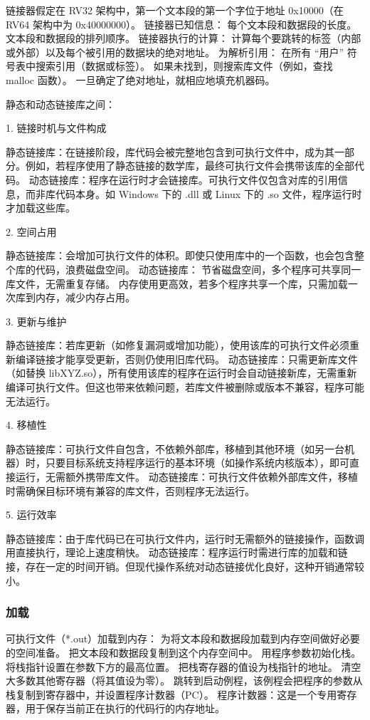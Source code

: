 \documentclass{ctexart}
\begin{document}
链接器假定在 RV32 架构中，第一个文本段的第一个字位于地址 0x10000（在 RV64 架构中为 0x40000000）。
链接器已知信息：
每个文本段和数据段的长度。
文本段和数据段的排列顺序。
链接器执行的计算：
计算每个要跳转的标签（内部或外部）以及每个被引用的数据块的绝对地址。
为解析引用：
在所有 “用户” 符号表中搜索引用（数据或标签）。
如果未找到，则搜索库文件（例如，查找 malloc 函数）。
一旦确定了绝对地址，就相应地填充机器码。\par
静态和动态链接库之间：\par
1. 链接时机与文件构成\par
静态链接库：在链接阶段，库代码会被完整地包含到可执行文件中，成为其一部分。例如，若程序使用了静态链接的数学库，最终可执行文件会携带该库的全部代码。
动态链接库：程序在运行时才会链接库。可执行文件仅包含对库的引用信息，而非库代码本身。如 Windows 下的 .dll 或 Linux 下的 .so 文件，程序运行时才加载这些库。\par
2. 空间占用\par
静态链接库：会增加可执行文件的体积。即使只使用库中的一个函数，也会包含整个库的代码，浪费磁盘空间。
动态链接库：
节省磁盘空间，多个程序可共享同一库文件，无需重复存储。
内存使用更高效，若多个程序共享一个库，只需加载一次库到内存，减少内存占用。\par
3. 更新与维护\par
静态链接库：若库更新（如修复漏洞或增加功能），使用该库的可执行文件必须重新编译链接才能享受更新，否则仍使用旧库代码。
动态链接库：只需更新库文件（如替换 libXYZ.so），所有使用该库的程序在运行时会自动链接新库，无需重新编译可执行文件。但这也带来依赖问题，若库文件被删除或版本不兼容，程序可能无法运行。\par
4. 移植性\par
静态链接库：可执行文件自包含，不依赖外部库，移植到其他环境（如另一台机器）时，只要目标系统支持程序运行的基本环境（如操作系统内核版本），即可直接运行，无需额外携带库文件。
动态链接库：可执行文件依赖外部库文件，移植时需确保目标环境有兼容的库文件，否则程序无法运行。\par
5. 运行效率\par
静态链接库：由于库代码已在可执行文件内，运行时无需额外的链接操作，函数调用直接执行，理论上速度稍快。
动态链接库：程序运行时需进行库的加载和链接，存在一定的时间开销。但现代操作系统对动态链接优化良好，这种开销通常较小。\par
\subsubsection{加载}
可执行文件（*.out）加载到内存：
为将文本段和数据段加载到内存空间做好必要的空间准备。
把文本段和数据段复制到这个内存空间中。
用程序参数初始化栈。
将栈指针设置在参数下方的最高位置。
把栈寄存器的值设为栈指针的地址。
清空大多数其他寄存器（将其值设为零）。
跳转到启动例程，该例程会把程序的参数从栈复制到寄存器中，并设置程序计数器（PC）。
程序计数器：这是一个专用寄存器，用于保存当前正在执行的代码行的内存地址。\par
\end{document}

